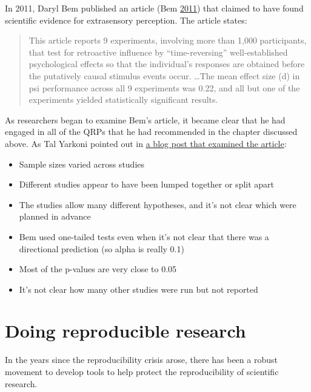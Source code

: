 \documentclass[12pt,]{book}
\providecommand{\tightlist}{%
  \setlength{\itemsep}{0pt}\setlength{\parskip}{0pt}}
\theoremstyle{definition}
\theoremstyle{definition}
\theoremstyle{definition}
\theoremstyle{remark}
\begin{document}
In 2011, Daryl Bem published an article (Bem \protect\hyperlink{ref-bem:2011}{2011}) that claimed to have found scientific evidence for extrasensory perception. The article states:

\begin{quote}
This article reports 9 experiments, involving more than 1,000 participants, that test for retroactive influence by ``time-reversing'' well-established psychological effects so that the individual's responses are obtained before the putatively causal stimulus events occur. \ldots{}The mean effect size (d) in psi performance across all 9 experiments was 0.22, and all but one of the experiments yielded statistically significant results.
\end{quote}

As researchers began to examine Bem's article, it became clear that he had engaged in all of the QRPs that he had recommended in the chapter discussed above. As Tal Yarkoni pointed out in \href{http://www.talyarkoni.org/blog/2011/01/10/the-psychology-of-parapsychology-or-why-good-researchers-publishing-good-articles-in-good-journals-can-still-get-it-totally-wrong/}{a blog post that examined the article}:

\begin{itemize}
\tightlist
\item
  Sample sizes varied across studies
\item
  Different studies appear to have been lumped together or split apart
\item
  The studies allow many different hypotheses, and it's not clear which were planned in advance
\item
  Bem used one-tailed tests even when it's not clear that there was a directional prediction (so alpha is really 0.1)
\item
  Most of the p-values are very close to 0.05
\item
  It's not clear how many other studies were run but not reported
\end{itemize}

\hypertarget{doing-reproducible-research-1}{%
\section{Doing reproducible research}\label{doing-reproducible-research-1}}

In the years since the reproducibility crisis arose, there has been a robust movement to develop tools to help protect the reproducibility of scientific research.
\end{document}
